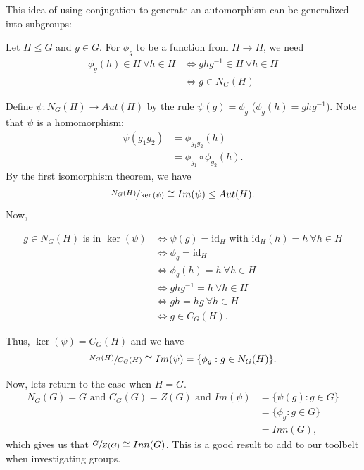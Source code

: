 \documentclass{article}
\begin{document}
This idea of using conjugation to generate an automorphism can be generalized into subgroups:

Let $H \leq G$ and $g \in G$. For $\phi_g$ to be a function from $H \longrightarrow H$, we need
\begin{align*}
    \phi_g(h) \in H \ \forall h \in H &\Longleftrightarrow ghg^{-1} \in H \ \forall h \in H \\
    &\Longleftrightarrow g \in N_G(H)
\end{align*}

Define $\psi:N_G(H) \longrightarrow Aut(H)$ by the rule $\psi(g)=\phi_g$ ($\phi_g(h) = ghg^{-1}$). Note that $\psi$ is a homomorphism:
\begin{align*}
    \psi(g_1g_2) &= \phi_{g_1g_2}(h) \\
    &= \phi_{g_1} \circ \phi_{g_2}(h).
\end{align*}
By the first isomorphism theorem, we have
\[
    \sfrac{N_G(H)}{\ker{(\psi)}} \cong Im(\psi) \leq Aut(H).
\]
Now, 

\begin{align*}
    g \in N_G(H) \text{ is in } \ker{(\psi)} &\Longleftrightarrow \psi(g) = \text{id}_H \text{ with } \text{id}_H(h)=h \ \forall h \in H \\
    &\Longleftrightarrow \phi_g=\text{id}_H \\
    &\Longleftrightarrow \phi_g(h)=h \ \forall h \in H \\
    &\Longleftrightarrow ghg^{-1} = h \ \forall h \in H \\
    &\Longleftrightarrow gh = hg \ \forall h \in H \\
    &\Longleftrightarrow g \in C_G(H).
\end{align*}

Thus, $\ker{(\psi)} = C_G(H)$ and we have
\[
    \sfrac{N_G(H)}{C_G(H)} \cong Im(\psi) = \{\phi_g:g \in N_G(H)\}.
\]

Now, lets return to the case when $H=G$. 
\begin{align*}
    N_G(G)=G \text{ and } C_G(G)=Z(G) \text{ and } Im(\psi) &= \{\psi(g):g \in G\} \\
    &= \{\phi_g:g \in G\} \\
    &= Inn(G),
\end{align*}
which gives us that $\sfrac{G}{Z(G)} \cong Inn(G)$. This is a good result to add to our toolbelt when investigating groups.

\newpage
\end{document}
